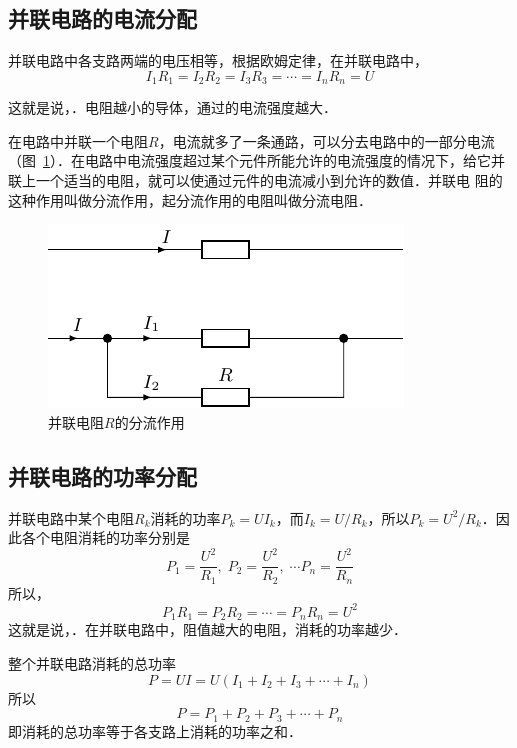 \subsection{并联电路的电流分配}
并联电路中各支路两端的电压相等，根据欧姆定律，在并联电路中，
\[I_1R_1=I_2R_2=I_3R_3=\cdots=I_nR_n=U \]

这就是说，．电阻越小的导体，通过的电流强度越大．

在电路中并联一个电阻$R$，电流就多了一条通路，可以分去电路中的一部分电流（图~\ref{fig_B_7-12}）．在电路中电流强度超过某个元件所能允许的电流强度的情况下，给它并联上一个适当的电阻，就可以使通过元件的电流减小到允许的数值．并联电
阻的这种作用叫做分流作用，起分流作用的电阻叫做分流电阻．
\begin{figure}[htbp]
    \centering
    \includegraphics{fig/B/7-12.pdf}
    \caption{并联电阻$R$的分流作用}\label{fig_B_7-12}
\end{figure}

\subsection{并联电路的功率分配}
并联电路中某个电阻$R_k$消耗的功率$P_k=UI_k$，而$I_k=U/R_k$，所以$P_k=U^2/R_k$．因此各个电阻消耗的功率分别是
\[ P_1=\frac{U^2}{R_1},\;  P_2=\frac{U^2}{R_2},\; \cdots  P_n=\frac{U^2}{R_n} \]
所以，
\[P_1R_1=P_2R_2=\cdots=P_nR_n=U^2 \]
这就是说，．在并联电路中，阻值越大的电阻，消耗的功率越少．

整个并联电路消耗的总功率
\[P=UI=U (I_1+I_2+I_3+\cdots+I_n) \]
所以
\[P=P_1+P_2+P_3+\cdots+P_n\]
即消耗的总功率等于各支路上消耗的功率之和．

